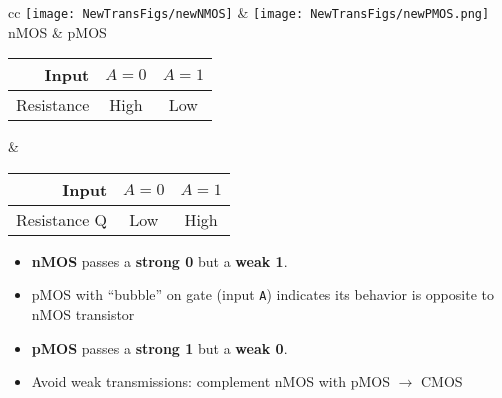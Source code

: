 \begin{frame}[fragile]


	\begin{center}
        \footnotesize
	\begin{tabular}{cc}
		\texttt{[image: NewTransFigs/newNMOS]} &
		\texttt{[image: NewTransFigs/newPMOS.png]} \\
	nMOS & pMOS\\
	\begin{tabular}{|r||c|c|}
	\hline
	Input& $A=0$ & $A=1$\\
	\hline
		Resistance& High & Low \\\hline
	\end{tabular} &

	\begin{tabular}{|r||c|c|}
	\hline
	Input& $A=0$ & $A=1$\\
	\hline
  	Resistance Q & Low  & High\\
   \hline
	\end{tabular}
	\end{tabular}
	\end{center}
 \begin{itemize}
  \item \textbf{nMOS} passes a \textbf{strong 0} but a {\color{gray}\textbf{weak 1}}. 
  \item pMOS with ``bubble'' on gate (input \texttt{A}) indicates its behavior is opposite to nMOS transistor 
  \item \textbf{pMOS} passes a \textbf{strong 1} but a {\color{gray}\textbf{weak 0}}. 
  \item Avoid weak transmissions: complement nMOS with pMOS $\rightarrow$ CMOS
\end{itemize}
\end{frame}
